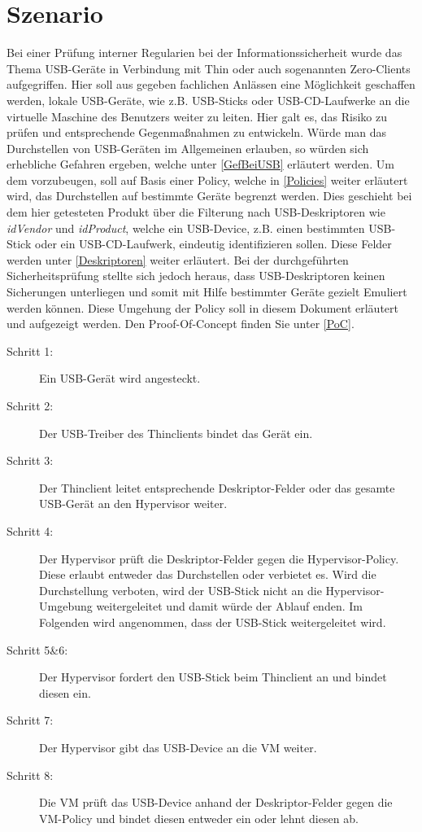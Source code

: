 \chapter{Szenario}
Bei einer Prüfung interner Regularien bei der Informationssicherheit wurde das Thema USB-Geräte in Verbindung mit Thin oder auch sogenannten Zero-Clients aufgegriffen. Hier soll aus gegeben fachlichen Anlässen eine Möglichkeit geschaffen werden, lokale USB-Geräte, wie z.B. USB-Sticks oder USB-CD-Laufwerke an die virtuelle Maschine des Benutzers weiter zu leiten. Hier galt es, das Risiko zu prüfen und entsprechende Gegenmaßnahmen zu entwickeln. 
Würde man das Durchstellen von USB-Geräten im Allgemeinen erlauben, so würden sich erhebliche Gefahren ergeben, welche unter \ref{GefBeiUSB} erläutert werden. Um dem vorzubeugen, soll auf Basis einer Policy, welche in \ref{Policies} weiter erläutert wird, das Durchstellen auf bestimmte Geräte begrenzt werden. Dies geschieht bei dem hier getesteten Produkt über die Filterung nach USB-Deskriptoren wie \textit{idVendor} und \textit{idProduct}, welche ein USB-Device, z.B. einen bestimmten USB-Stick oder ein USB-CD-Laufwerk, eindeutig identifizieren sollen. Diese Felder werden unter \ref{Deskriptoren} weiter erläutert.
Bei der durchgeführten Sicherheitsprüfung stellte sich jedoch heraus, dass USB-Deskriptoren keinen Sicherungen unterliegen und somit mit Hilfe bestimmter Geräte gezielt Emuliert werden können. Diese Umgehung der Policy soll in diesem Dokument erläutert und aufgezeigt werden. Den Proof-Of-Concept finden Sie unter \ref{PoC}.



\begin{description}
	\item[Schritt 1: ] Ein USB-Gerät wird angesteckt.
	\item[Schritt 2: ] Der USB-Treiber des Thinclients bindet das Gerät ein.
	\item[Schritt 3: ] Der Thinclient leitet entsprechende Deskriptor-Felder oder das gesamte USB-Gerät an den Hypervisor weiter. 
	\item[Schritt 4: ] Der Hypervisor prüft die Deskriptor-Felder gegen die Hypervisor-Policy. Diese erlaubt entweder das Durchstellen oder verbietet es. Wird die Durchstellung verboten, wird der USB-Stick nicht an die Hypervisor-Umgebung weitergeleitet und damit würde der Ablauf enden. Im Folgenden wird angenommen, dass der USB-Stick weitergeleitet wird.
	\item[Schritt 5\&6: ] Der Hypervisor fordert den USB-Stick beim Thinclient an und bindet diesen ein.
	\item[Schritt 7: ] Der Hypervisor gibt das USB-Device an die VM weiter.
	\item[Schritt 8: ] Die VM prüft das USB-Device anhand der Deskriptor-Felder gegen die VM-Policy und bindet diesen entweder ein oder lehnt diesen ab.
\end{description}